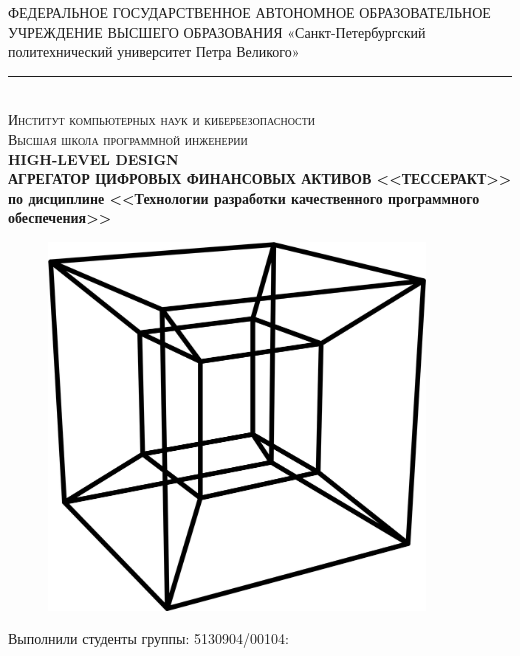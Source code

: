 \documentclass[a4paper, 14pt]{article}
\begin{document}
\begin{titlepage}
    \center

    ФЕДЕРАЛЬНОЕ ГОСУДАРСТВЕННОЕ АВТОНОМНОЕ ОБРАЗОВАТЕЛЬНОЕ УЧРЕЖДЕНИЕ ВЫСШЕГО ОБРАЗОВАНИЯ\linebreak
    «Санкт-Петербургский политехнический университет Петра Великого»
    \noindent\rule{500pt}{0.8pt} \\
    \textsc{\Large Институт компьютерных наук и кибербезопасности}\\
    \textsc{\large Высшая школа программной инженерии}\\[1.5cm]

    { \huge \bfseries HIGH-LEVEL DESIGN	\\
    \Large \mdseries АГРЕГАТОР ЦИФРОВЫХ ФИНАНСОВЫХ АКТИВОВ <<ТЕССЕРАКТ>> \\
    \large по дисциплине <<Технологии разработки качественного программного обеспечения>>}\\
    \flushright{
        {\phantom{qwe}}\\[1.0cm]
    }

    \begin{figure}[H]
        \centering
        \includegraphics[width=10cm]{resources/1.png}\\[2.0cm]
    \end{figure}

    \begin{multicols}{2}
        \begin{flushright} \large

            {Выполнили студенты группы: 5130904/00104:}\\
            {\phantom{qwe}}\\
            {\phantom{qwe}}\\
            {\phantom{qwe}}\\
            {\phantom{qwe}}\\


\end{flushright}
\end{multicols}
\end{titlepage}
\end{document}
